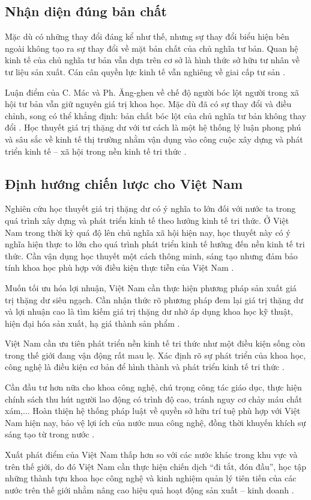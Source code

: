 \subsection{Nhận diện đúng bản chất}

Mặc dù có những thay đổi đáng kể như thế, nhưng sự thay đổi biểu hiện bên ngoài không tạo ra sự thay đổi về mặt bản chất của chủ nghĩa tư bản. Quan hệ kinh tế của chủ nghĩa tư bản vẫn dựa trên cơ sở là hình thức sở hữu tư nhân về tư liệu sản xuất. Cán cân quyền lực kinh tế vẫn nghiêng về giai cấp tư sản \cite{tapchi_congthuong_gttd}.

Luận điểm của C. Mác và Ph. Ăng-ghen về chế độ người bóc lột người trong xã hội tư bản vẫn giữ nguyên giá trị khoa học. Mặc dù đã có sự thay đổi và điều chỉnh, song có thể khẳng định: bản chất bóc lột của chủ nghĩa tư bản không thay đổi \cite{tran_hieu_gttd}. Học thuyết giá trị thặng dư với tư cách là một hệ thống lý luận phong phú và sâu sắc về kinh tế thị trường nhằm vận dụng vào công cuộc xây dựng và phát triển kinh tế -- xã hội trong nền kinh tế tri thức \cite{tapchi_congthuong_gttd}.

\subsection{Định hướng chiến lược cho Việt Nam}

Nghiên cứu học thuyết giá trị thặng dư có ý nghĩa to lớn đối với nước ta trong quá trình xây dựng và phát triển kinh tế theo hướng kinh tế tri thức. Ở Việt Nam trong thời kỳ quá độ lên chủ nghĩa xã hội hiện nay, học thuyết này có ý nghĩa hiện thực to lớn cho quá trình phát triển kinh tế hướng đến nền kinh tế tri thức. Cần vận dụng học thuyết một cách thông minh, sáng tạo nhưng đảm bảo tính khoa học phù hợp với điều kiện thực tiễn của Việt Nam \cite{tapchi_congthuong_gttd}.

Muốn tối ưu hóa lợi nhuận, Việt Nam cần thực hiện phương pháp sản xuất giá trị thặng dư siêu ngạch. Cần nhận thức rõ phương pháp đem lại giá trị thặng dư và lợi nhuận cao là tìm kiếm giá trị thặng dư nhờ áp dụng khoa học kỹ thuật, hiện đại hóa sản xuất, hạ giá thành sản phẩm \cite{tapchi_congthuong_gttd}.

Việt Nam cần ưu tiên phát triển nền kinh tế tri thức như một điều kiện sống còn trong thế giới đang vận động rất mau lẹ. Xác định rõ sự phát triển của khoa học, công nghệ là điều kiện cơ bản để hình thành và phát triển kinh tế tri thức \cite{tapchi_congthuong_gttd}.

Cần đầu tư hơn nữa cho khoa công nghệ, chú trọng công tác giáo dục, thực hiện chính sách thu hút người lao động có trình độ cao, tránh nguy cơ chảy máu chất xám,... Hoàn thiện hệ thống pháp luật về quyền sở hữu trí tuệ phù hợp với Việt Nam hiện nay, bảo vệ lợi ích của nước mua công nghệ, đồng thời khuyến khích sự sáng tạo từ trong nước \cite{tapchi_congthuong_gttd}.

Xuất phát điểm của Việt Nam thấp hơn so với các nước khác trong khu vực và trên thế giới, do đó Việt Nam cần thực hiện chiến dịch ``đi tắt, đón đầu'', học tập những thành tựu khoa học công nghệ và kinh nghiệm quản lý tiên tiến của các nước trên thế giới nhằm nâng cao hiệu quả hoạt động sản xuất -- kinh doanh \cite{tapchi_congthuong_gttd}.
